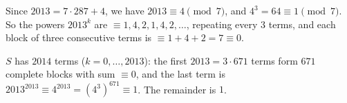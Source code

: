 Since $2013=7\cdot287+4$, we have $2013\equiv4\pmod7$, and $4^3=64\equiv1\pmod7$. So the powers $2013^k$ are $\equiv1,4,2,1,4,2,\dots$, repeating every $3$ terms, and each block of three consecutive terms is $\equiv1+4+2=7\equiv0$.

$S$ has $2014$ terms ($k=0,\dots,2013$): the first $2013=3\cdot671$ terms form $671$ complete blocks with sum $\equiv0$, and the last term is $2013^{2013}\equiv4^{2013}=\left(4^3\right)^{671}\equiv1$. The remainder is $\boxed{1}$.
